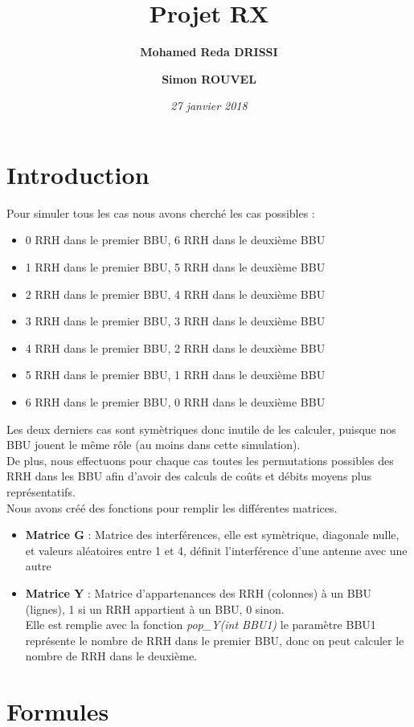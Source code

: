 \documentclass[a4paper,sans,titlepage,10pt]{article}
\title{Projet RX}
\author { \textbf{Mohamed Reda DRISSI }
			\and
		   \textbf{Simon ROUVEL}}
\date{\textit{27 janvier 2018}}
\begin{document}
\maketitle

\tableofcontents
\clearpage
\section{Introduction}
Pour simuler tous les cas nous avons cherché les cas possibles :
\begin{itemize}
	\item 0 RRH dans le premier BBU, 6 RRH dans le deuxième BBU
	\item 1 RRH dans le premier BBU, 5 RRH dans le deuxième BBU
	\item 2 RRH dans le premier BBU, 4 RRH dans le deuxième BBU
	\item 3 RRH dans le premier BBU, 3 RRH dans le deuxième BBU
	\item 4 RRH dans le premier BBU, 2 RRH dans le deuxième BBU
	\item 5 RRH dans le premier BBU, 1 RRH dans le deuxième BBU
	\item 6 RRH dans le premier BBU, 0 RRH dans le deuxième BBU
\end{itemize}
Les deux derniers cas sont symètriques donc inutile de les calculer, puisque nos BBU jouent
le même rôle (au moins dans cette simulation).\\
De plus, nous effectuons pour chaque cas toutes les permutations possibles des RRH dans les BBU afin d'avoir des calculs de coûts et débits moyens plus représentatifs.\\
Nous avons créé des fonctions pour remplir les différentes matrices.
\begin{itemize}
	\item \textbf{Matrice G} : Matrice des interférences, elle est symètrique, diagonale nulle, et valeurs aléatoires entre 1 et 4, définit l'interférence d'une antenne avec une autre
	\item \textbf{Matrice Y} : Matrice d'appartenances des RRH (colonnes) à un BBU (lignes), 1 si un RRH appartient à un BBU, 0 sinon.\\
	Elle est remplie avec la fonction \textit{pop\_Y(int BBU1)}
		le paramètre BBU1 représente le nombre de RRH dans le premier BBU, donc on peut
		calculer le nombre de RRH dans le deuxième.

\end{itemize}
\section{Formules}
\end{document}
